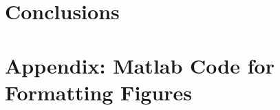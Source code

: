 \documentclass[11pt]{article}
\begin{document}
\section*{Conclusions}
\newpage
\fancyhead{}

%
\newpage
\section{Appendix: Matlab Code for Formatting Figures}



\vspace*{\fill}
\newpage
\flushleft
\appendix
\section{}
\end{document}
